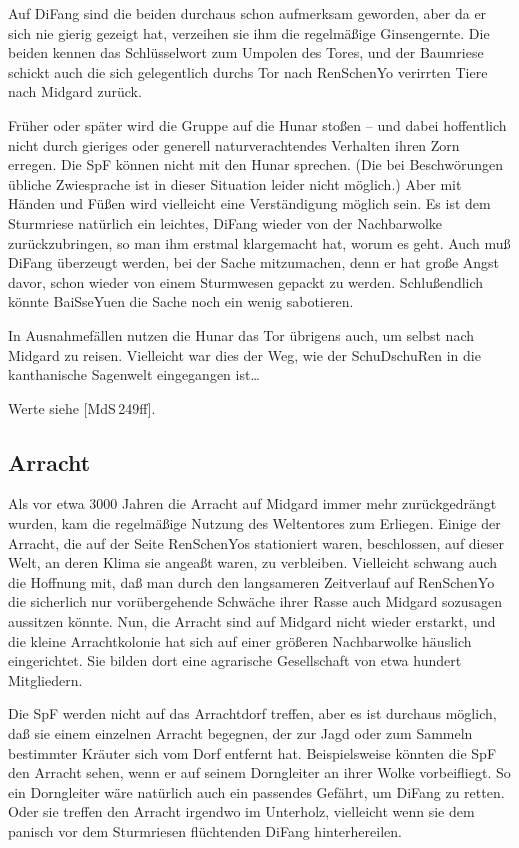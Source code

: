 \documentclass[
a4paper,
twoside,
DIV=calc,
BCOR=4mm,
fontsize=9pt,
twocolumn=on,
titlepage=on,
parskip=half
]{scrartcl}
\begin{document}
Auf DiFang sind die beiden durchaus schon aufmerksam geworden, aber da
er sich nie gierig gezeigt hat, verzeihen sie ihm die regelmäßige
Ginsengernte. Die beiden kennen das Schlüsselwort zum Umpolen des
Tores, und der Baumriese schickt auch die sich gelegentlich durchs Tor
nach RenSchenYo verirrten Tiere nach Midgard zurück.

Früher oder später wird die Gruppe auf die Hunar stoßen -- und dabei
hoffentlich nicht durch gieriges oder generell naturverachtendes
Verhalten ihren Zorn erregen. Die SpF können nicht mit den Hunar
sprechen. (Die bei Beschwörungen übliche Zwiesprache ist in dieser
Situation leider nicht möglich.) Aber mit Händen und Füßen wird
vielleicht eine Verständigung möglich sein. Es ist dem Sturmriese
natürlich ein leichtes, DiFang wieder von der Nachbarwolke
zurückzubringen, so man ihm erstmal klargemacht hat, worum es
geht. Auch muß DiFang überzeugt werden, bei der Sache mitzumachen,
denn er hat große Angst davor, schon wieder von einem Sturmwesen
gepackt zu werden. Schlußendlich könnte BaiSseYuen die Sache noch ein
wenig sabotieren.

In Ausnahmefällen nutzen die Hunar das Tor übrigens auch, um selbst
nach Midgard zu reisen. Vielleicht war dies der Weg, wie der
SchuDschuRen in die kanthanische Sagenwelt eingegangen ist\dots

Werte siehe [MdS\,249ff].

\subsection{Arracht}

Als vor etwa 3000 Jahren die Arracht auf Midgard immer mehr
zurückgedrängt wurden, kam die regelmäßige Nutzung des Weltentores zum
Erliegen. Einige der Arracht, die auf der Seite RenSchenYos
stationiert waren, beschlossen, auf dieser Welt, an deren Klima sie
angeaßt waren, zu verbleiben. Vielleicht schwang auch die Hoffnung
mit, daß man durch den langsameren Zeitverlauf auf RenSchenYo die
sicherlich nur vorübergehende Schwäche ihrer Rasse auch Midgard
sozusagen aussitzen könnte. Nun, die Arracht sind auf Midgard nicht
wieder erstarkt, und die kleine Arrachtkolonie hat sich auf einer
größeren Nachbarwolke häuslich eingerichtet. Sie bilden dort eine
agrarische Gesellschaft von etwa hundert Mitgliedern.

Die SpF werden nicht auf das Arrachtdorf treffen, aber es ist durchaus
möglich, daß sie einem einzelnen Arracht begegnen, der zur Jagd oder
zum Sammeln bestimmter Kräuter sich vom Dorf entfernt
hat. Beispielsweise könnten die SpF den Arracht sehen, wenn er auf
seinem Dorngleiter an ihrer Wolke vorbeifliegt. So ein Dorngleiter
wäre natürlich auch ein passendes Gefährt, um DiFang zu retten. Oder
sie treffen den Arracht irgendwo im Unterholz, vielleicht wenn sie dem
panisch vor dem Sturmriesen flüchtenden DiFang hinterhereilen.
\end{document}
